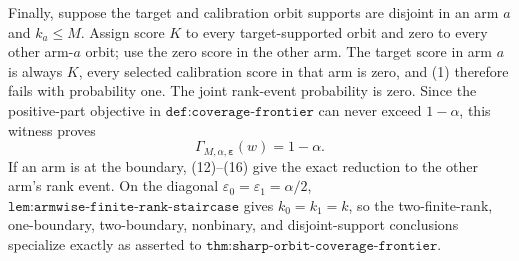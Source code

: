 Finally, suppose the target and calibration orbit supports are disjoint in an arm \(a\) and \(k_a\le M\). Assign score \(K\) to every target-supported orbit and zero to every other arm-\(a\) orbit; use the zero score in the other arm. The target score in arm \(a\) is always \(K\), every selected calibration score in that arm is zero, and (1) therefore fails with probability one. The joint rank-event probability is zero. Since the positive-part objective in \(\texttt{def:coverage-frontier}\) can never exceed \(1-\alpha\), this witness proves
\[
\Gamma_{M,\alpha,\boldsymbol\varepsilon}(w)=1-\alpha. \tag{23}
\]
If an arm is at the boundary, (12)--(16) give the exact reduction to the other arm's rank event. On the diagonal \(\varepsilon_0=\varepsilon_1=\alpha/2\), \(\texttt{lem:armwise-finite-rank-staircase}\) gives \(k_0=k_1=k\), so the two-finite-rank, one-boundary, two-boundary, nonbinary, and disjoint-support conclusions specialize exactly as asserted to \(\texttt{thm:sharp-orbit-coverage-frontier}\).